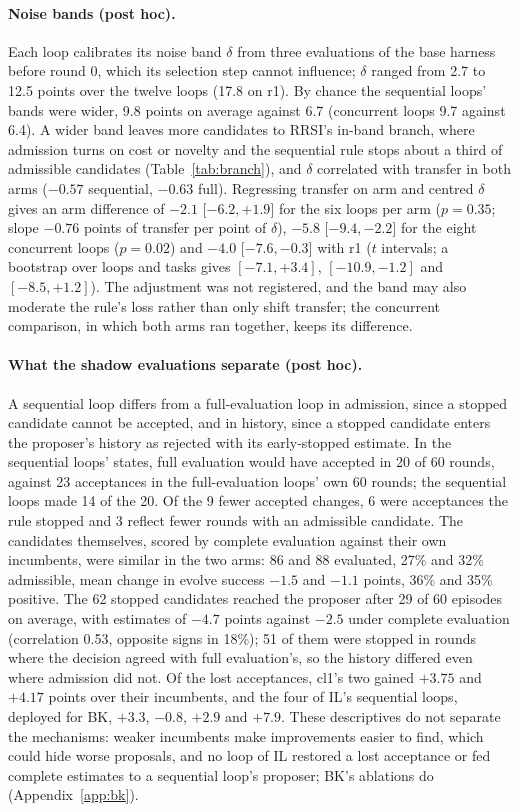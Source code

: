 \documentclass[11pt]{article}
\begin{document}
\paragraph{Noise bands (post hoc).} Each loop calibrates its noise band $\delta$ from three evaluations of the base harness before round 0, which its selection step cannot influence; $\delta$ ranged from 2.7 to 12.5 points over the twelve loops (17.8 on r1). By chance the sequential loops' bands were wider, 9.8 points on average against 6.7 (concurrent loops 9.7 against 6.4). A wider band leaves more candidates to RRSI's in-band branch, where admission turns on cost or novelty and the sequential rule stops about a third of admissible candidates (Table~\ref{tab:branch}), and $\delta$ correlated with transfer in both arms ($-0.57$ sequential, $-0.63$ full). Regressing transfer on arm and centred $\delta$ gives an arm difference of $-2.1$ [$-6.2,+1.9$] for the six loops per arm ($p=0.35$; slope $-0.76$ points of transfer per point of $\delta$), $-5.8$ [$-9.4,-2.2$] for the eight concurrent loops ($p=0.02$) and $-4.0$ [$-7.6,-0.3$] with r1 ($t$ intervals; a bootstrap over loops and tasks gives $[-7.1,+3.4]$, $[-10.9,-1.2]$ and $[-8.5,+1.2]$). The adjustment was not registered, and the band may also moderate the rule's loss rather than only shift transfer; the concurrent comparison, in which both arms ran together, keeps its difference.

\paragraph{What the shadow evaluations separate (post hoc).} A sequential loop differs from a full-evaluation loop in admission, since a stopped candidate cannot be accepted, and in history, since a stopped candidate enters the proposer's history as rejected with its early-stopped estimate. In the sequential loops' states, full evaluation would have accepted in 20 of 60 rounds, against 23 acceptances in the full-evaluation loops' own 60 rounds; the sequential loops made 14 of the 20. Of the 9 fewer accepted changes, 6 were acceptances the rule stopped and 3 reflect fewer rounds with an admissible candidate. The candidates themselves, scored by complete evaluation against their own incumbents, were similar in the two arms: 86 and 88 evaluated, 27\% and 32\% admissible, mean change in evolve success $-1.5$ and $-1.1$ points, 36\% and 35\% positive. The 62 stopped candidates reached the proposer after 29 of 60 episodes on average, with estimates of $-4.7$ points against $-2.5$ under complete evaluation (correlation 0.53, opposite signs in 18\%); 51 of them were stopped in rounds where the decision agreed with full evaluation's, so the history differed even where admission did not. Of the lost acceptances, cl1's two gained $+3.75$ and $+4.17$ points over their incumbents, and the four of IL's sequential loops, deployed for BK, $+3.3$, $-0.8$, $+2.9$ and $+7.9$. These descriptives do not separate the mechanisms: weaker incumbents make improvements easier to find, which could hide worse proposals, and no loop of IL restored a lost acceptance or fed complete estimates to a sequential loop's proposer; BK's ablations do (Appendix~\ref{app:bk}).
\end{document}
